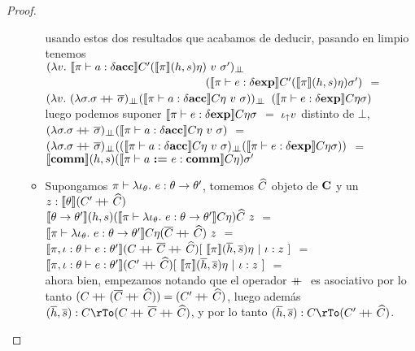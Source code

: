 \begin{proof}
\begin{itemize}
\begin{itemize}
usando estos dos resultados que acabamos de deducir, pasando en limpio tenemos\\

$(\lambda v. \ 
	\semBrcks{\pi \vdash a : \deltaacc}C'(\semBrcks{\pi}(h,s)\eta)\ v \ \sigma')_{\dbot}$\\
\indent \ \ \ \ \ \ \ \ \ \ \ \ \ \ \ \ \ \ \ \ \ \ \ \ \ \ \ \
$(\llbracket \pi \vdash e : \delta \textbf{exp} \rrbracket C'(\llbracket \pi \rrbracket(h,s)\eta)\sigma')$ $=$\\
$(\lambda v. \ (\lambda \sigma . \sigma \concat \sigmaover)_{\dbot}
				(\semBrcks{\pi \vdash a : \deltaacc} C \eta \ v \ \sigma))_{\dbot}$
$(\llbracket \pi \vdash e : \delta \textbf{exp} \rrbracket C \eta \sigma)$ \\

luego podemos suponer $\llbracket \pi \vdash e : \delta \textbf{exp} \rrbracket C \eta \sigma$ $=$ $\iota_{\uparrow} v$ distinto
de $\bot$,\\

$(\lambda \sigma . \sigma \concat \sigmaover)_{\dbot}
				(\semBrcks{\pi \vdash a : \deltaacc} C \eta \ v \ \sigma)$ $=$\\
$(\lambda \sigma . \sigma \concat \sigmaover)_{\dbot}
	((\semBrcks{\pi \vdash a : \deltaacc} C \eta \ v \ \sigma)_{\dbot}
			(\semBrcks{\pi \vdash e : \deltaexp}C \eta \sigma))$ $=$\\
$\llbracket \textbf{comm} \rrbracket(h,s)(\llbracket \pi \vdash a \ \textbf{:=} \ e : \textbf{comm} \rrbracket C\eta)\sigma'$\\

\item Supongamos $\pi \vdash \lambda \iota_{\theta} . \ e : \theta \rightarrow \theta'$, tomemos
$\widehat{C}$ objeto de $\textbf{C}$ y un $z : \llbracket \theta \rrbracket(C'+\kern-1.3ex+\kern0.8ex\widehat{C})$ \\

$\llbracket \theta \rightarrow \theta' \rrbracket(h,s)
(\llbracket \pi \vdash 
	\lambda \iota_{\theta} . \ e : \theta \rightarrow \theta' \rrbracket C \eta)\widehat{C} \ z$ $=$\\
$\llbracket \pi \vdash \lambda \iota_{\theta} . \ e : \theta \rightarrow \theta' \rrbracket C 
	\eta (\overline{C} +\kern-1.3ex+\kern0.8ex \widehat{C}) \ z$ $=$\\
$\llbracket \pi,\iota:\theta \vdash e : \theta' \rrbracket
	(C +\kern-1.3ex+\kern0.8ex \overline{C} +\kern-1.3ex+\kern0.8ex \widehat{C})
	[ \ \llbracket \pi \rrbracket(\overline{h},\overline{s})\eta \ | \ \iota:z \ ]$ $=$\\
$\llbracket \pi,\iota:\theta \vdash e : \theta' \rrbracket
	(C' +\kern-1.3ex+\kern0.8ex \widehat{C})
	[ \ \llbracket \pi \rrbracket(\overline{h},\overline{s})\eta \ | \ \iota:z \ ]$ $=$\\

ahora bien, empezamos notando que el operador $+\kern-1.3ex+\kern0.8ex$ es asociativo por lo tanto
$(C +\kern-1.3ex+\kern0.8ex (\overline{C} +\kern-1.3ex+\kern0.8ex \widehat{C})) = (C' +\kern-1.3ex+\kern0.8ex \widehat{C})$, luego adem\'as
$(\hover,\sover) : C \rTo (C \concat \Cover \concat \Chat)$, y por lo tanto
$(\hover,\sover) : C \rTo (C' \concat \Chat)$.\\


\end{itemize}
\end{itemize}
\end{proof}
